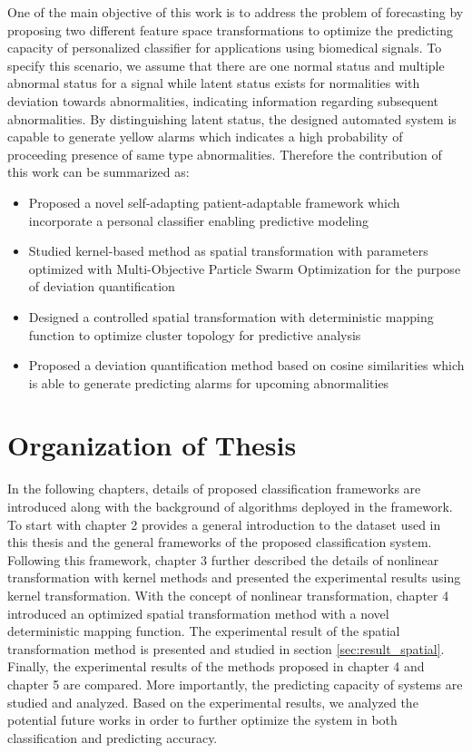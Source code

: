 One of the main objective of this work is to address the problem of forecasting by proposing two different feature space transformations to optimize the predicting capacity of personalized classifier for applications using biomedical signals. To specify this scenario, we assume that there are one normal status and multiple abnormal status for a signal while latent status exists for normalities with deviation towards abnormalities, indicating information regarding subsequent abnormalities. By distinguishing  latent status, the designed automated system is capable to generate yellow alarms which indicates a high probability of proceeding presence of same type abnormalities. Therefore the contribution of this work can be summarized as:

\begin{itemize}
    \item Proposed a novel self-adapting patient-adaptable framework  which incorporate a personal classifier enabling predictive modeling
    \item Studied kernel-based method as spatial transformation with parameters optimized with Multi-Objective Particle Swarm Optimization for the purpose of deviation quantification
    \item Designed a controlled spatial transformation with deterministic mapping function to optimize cluster topology for predictive analysis
    \item Proposed a deviation quantification method based on cosine similarities which is able to generate predicting alarms for upcoming abnormalities
\end{itemize}


\section{Organization of Thesis}

In the following chapters, details of proposed classification frameworks are introduced along with the background of algorithms deployed in the framework. To start with chapter 2 provides a general introduction to the dataset used in this thesis and the general frameworks of the proposed classification system. Following this framework, chapter 3 further described the details of nonlinear transformation with kernel methods and presented the experimental results using kernel transformation. With the concept of nonlinear transformation, chapter 4 introduced an optimized spatial transformation method with a novel deterministic mapping function. The experimental result of the spatial transformation method is presented and studied in section \ref{sec:result_spatial}. Finally, the experimental results of the methods proposed in chapter 4 and chapter 5 are compared. More importantly, the predicting capacity of systems are studied and analyzed. Based on the experimental results, we analyzed the potential future works in order to further optimize the system in both classification and predicting accuracy.
